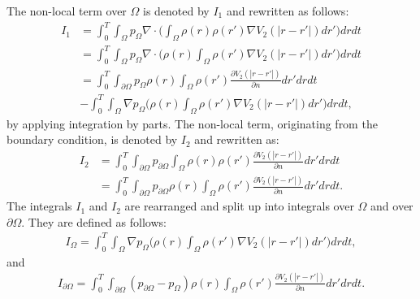 The non-local term over $\Omega$ is denoted by $I_1$ and rewritten as follows:
\begin{align*}
I_1&=\int_0^T \int_\Omega p_\Omega \nabla \cdot \bigg(\int_\Omega \rho(r) \rho(r') \nabla V_2(|r-r'|)  dr'\bigg)  dr dt\\
&= \int_0^T \int_\Omega  p_\Omega \nabla \cdot \bigg( \rho(r) \int_\Omega \rho(r') \nabla V_2(|r-r'|) dr'\bigg)  dr dt\\
&= \int_0^T \int_{\partial \Omega}  p_\Omega  \rho(r) \int_\Omega \rho(r') \frac{ \partial V_2(|r-r'|)}{\partial n} dr' dr dt\\
&-\int_0^T \int_\Omega \nabla  p_\Omega \bigg( \rho(r) \int_\Omega \rho(r') \nabla V_2(|r-r'|) dr'\bigg)  dr dt,
\end{align*}
by applying integration by parts.
The non-local term, originating from the boundary condition, is denoted by $I_2$ and rewritten as:
\begin{align*}
I_2&=\int_0^T\int_{\partial \Omega} p_{\partial \Omega}\int_\Omega \rho(r) \rho(r') \frac{\partial V_2(|r-r'|)}{\partial n} dr'dr dt\\
&=\int_0^T \int_{\partial \Omega} p_{\partial \Omega} \rho(r)  \int_\Omega \rho(r') \frac{\partial V_2(|r-r'|)}{\partial n} dr'dr dt.
\end{align*}
The integrals $I_1$ and $I_2$ are rearranged and split up into integrals over $\Omega$ and over $\partial \Omega$. They are defined as follows:
\begin{align*}
I_\Omega=\int_0^T \int_\Omega \nabla  p_\Omega \bigg( \rho(r) \int_\Omega \rho(r') \nabla V_2(|r-r'|) dr'\bigg)  dr dt,
\end{align*}
and
\begin{align*}
I_{\partial \Omega}=\int_0^T \int_{\partial \Omega} ( p_{\partial \Omega} - p_\Omega) \rho(r)  \int_\Omega \rho(r') \frac{\partial V_2(|r-r'|)}{\partial n} dr'dr dt.
\end{align*}


